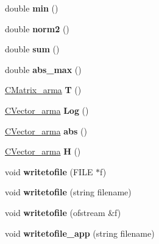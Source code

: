 \begin{DoxyCompactItemize}
double {\bfseries min} ()
\item 
\mbox{\label{class_c_vector__arma_af0770634a4002b77f77ed1183eb49cd0}} 
double {\bfseries norm2} ()
\item 
\mbox{\label{class_c_vector__arma_a364af718bf1f67682a7f989cfcbedfef}} 
double {\bfseries sum} ()
\item 
\mbox{\label{class_c_vector__arma_acc68b6b091cb9cc13bc4170e439c0a2b}} 
double {\bfseries abs\+\_\+max} ()
\item 
\mbox{\label{class_c_vector__arma_ad983e5f59cf8fb9e08e39cb42ee9a689}} 
\hyperlink{class_c_matrix__arma}{C\+Matrix\+\_\+arma} {\bfseries T} ()
\item 
\mbox{\label{class_c_vector__arma_acebd608e14d37d07e27a44b7de2ad7e6}} 
\hyperlink{class_c_vector__arma}{C\+Vector\+\_\+arma} {\bfseries Log} ()
\item 
\mbox{\label{class_c_vector__arma_a56bf719016c20fba511c0a03313c261a}} 
\hyperlink{class_c_vector__arma}{C\+Vector\+\_\+arma} {\bfseries abs} ()
\item 
\mbox{\label{class_c_vector__arma_a7c20fdf999bffa76907723d829ab8873}} 
\hyperlink{class_c_vector__arma}{C\+Vector\+\_\+arma} {\bfseries H} ()
\item 
\mbox{\label{class_c_vector__arma_af37d3b92d6251d9c252b91c151135c9d}} 
void {\bfseries writetofile} (F\+I\+LE $\ast$f)
\item 
\mbox{\label{class_c_vector__arma_a9936cecabccfef4ba671ffab01e62233}} 
void {\bfseries writetofile} (string filename)
\item 
\mbox{\label{class_c_vector__arma_a8b81334e7bd7a736cacbc6d578b4e4a5}} 
void {\bfseries writetofile} (ofstream \&f)
\item 
\mbox{\label{class_c_vector__arma_a0f1916e04a729c60b97194865504d44f}} 
void {\bfseries writetofile\+\_\+app} (string filename)

\end{DoxyCompactItemize}
